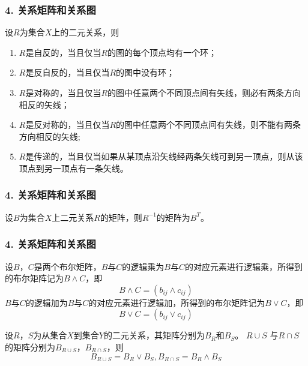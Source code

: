 \documentclass{beamer}
\begin{document}
\begin{CJK*}{UTF8}{gbsn}
\begin{frame}
  \frametitle{4. 关系矩阵和关系图}
  \begin{Thm}
  设$R$为集合$X$上的二元关系，则
  \begin{enumerate}[(1)]
  \item $R$是自反的，当且仅当$R$的图的每个顶点均有一个环；
  \item $R$是反自反的，当且仅当$R$的图中没有环；
  \item $R$是对称的，当且仅当$R$的图中任意两个不同顶点间有矢线，则必有两条方向相反的矢线；
  \item $R$是反对称的，当且仅当$R$的图中任意两个不同顶点间有失线，则不能有两条方向相反的矢线;
  \item $R$是传递的，当且仅当如果从某顶点沿矢线经两条矢线可到另一顶点，则从该顶点到另一顶点有一条矢线。
  \end{enumerate}
\end{Thm}
\end{frame}
\begin{frame}
  \frametitle{4. 关系矩阵和关系图}
  \begin{Thm}
    设$B$为集合$X$上二元关系$R$的矩阵，则$R^{-1}$的矩阵为$B^{T}$。
  \end{Thm}
\end{frame}

\begin{frame}
  \frametitle{4. 关系矩阵和关系图}
  \begin{Def}
    设$B$，$C$是两个布尔矩阵，$B$与$C$的逻辑乘为$B$与$C$的对应元素进行逻辑乘，所得到的布尔矩阵记为$B \land C$，即
    \begin{equation*}
      B \land C = (b_{ij} \land c_{ij})
    \end{equation*}
    $B$与$C$的逻辑加为$B$与$C$的对应元素进行逻辑加，所得到的布尔矩阵记为$B \lor C$，即
    \begin{equation*}
      B \lor C = (b_{ij} \lor c_{ij})
    \end{equation*}
  \end{Def}
  \begin{Thm}
    设$R$，$S$为从集合$X$到集合$Y$的二元关系，其矩阵分别为$B_R$和$B_S$。 $R\cup S$ 与$R \cap S$的矩阵分别为$B_{R\cup S}$，$B_{R\cap S}$，则
    \begin{equation*}
      B_{R\cup S}=B_R \lor B_S, B_{R\cap S}=B_R \land B_S
    \end{equation*}
  \end{Thm}
\end{frame}


\end{CJK*}
\end{document}
